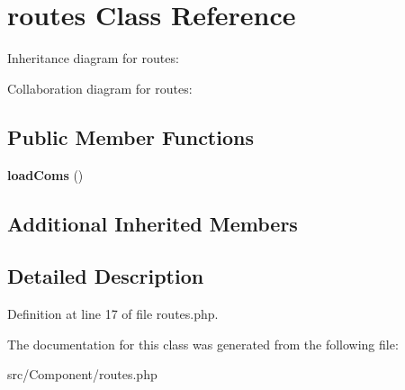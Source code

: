 \hypertarget{class_zest_1_1_component_1_1routes}{}\section{routes Class Reference}
\label{class_zest_1_1_component_1_1routes}


Inheritance diagram for routes\+:


Collaboration diagram for routes\+:
\subsection*{Public Member Functions}
\begin{DoxyCompactItemize}
\item 
\mbox{\label{class_zest_1_1_component_1_1routes_a7b810b6c37ce59abc852efb67da8cda6}} 
{\bfseries load\+Coms} ()
\end{DoxyCompactItemize}
\subsection*{Additional Inherited Members}


\subsection{Detailed Description}


Definition at line 17 of file routes.\+php.



The documentation for this class was generated from the following file\+:\begin{DoxyCompactItemize}
\item 
src/\+Component/routes.\+php\end{DoxyCompactItemize}
